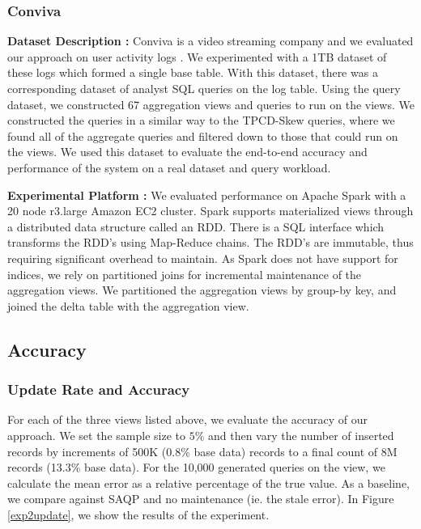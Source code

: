 \subsubsection{Conviva}
{\noindent \bf Dataset Description :}
Conviva is a video streaming company and we evaluated our approach on user activity logs \cite{conviva}.
We experimented with a 1TB dataset of these logs which formed a single base table.
With this dataset, there was a corresponding dataset of analyst SQL queries on the log table.
Using the query dataset, we constructed 67 aggregation views and queries to run on the views.
We constructed the queries in a similar way to the TPCD-Skew queries, where we found all of the aggregate queries and filtered down
to those that could run on the views.
We used this dataset to evaluate the end-to-end accuracy and performance of the system on a real dataset and query workload.

\vspace{0.5em}

{\noindent \bf Experimental Platform :}
We evaluated performance on Apache Spark with a 20 node r3.large Amazon EC2 cluster. 
Spark supports materialized views through a distributed data structure called an RDD.
There is a SQL interface which transforms the RDD's using Map-Reduce chains.
The RDD's are immutable, thus requiring significant overhead to maintain.
As Spark does not have support for indices, we rely on partitioned joins for incremental maintenance of the aggregation views.
We partitioned the aggregation views by group-by key, and joined the delta table with the aggregation view.

\subsection{Accuracy}

\subsubsection{Update Rate and Accuracy}
For each of the three views listed above, we evaluate the accuracy of our approach.
We set the sample size to $5\%$ and then vary the number of inserted records by increments of 500K (0.8\% base data) records to a final count of 8M records (13.3\% base data).
For the 10,000 generated queries on the view, we calculate the mean error as a relative percentage of the true value.
As a baseline, we compare against SAQP and no maintenance (ie. the stale error).
In Figure \ref{exp2update}, we show the results of the experiment. 

